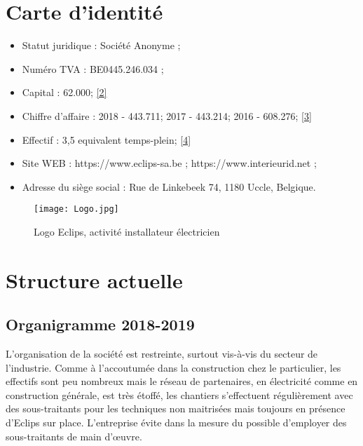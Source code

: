 \documentclass[a4paper, 12pt]{article}
\begin{document}
\section{Carte d'identité}
 
    \begin{itemize}
        \item Statut juridique : Société Anonyme ;
        \item Numéro TVA : BE0445.246.034 ;
        \item Capital : 62.000\EUR; \href{https://kbopub.economie.fgov.be/kbopub/zoeknummerform.html?nummer=0445.246.034&actionLu=Recherche#null}{[2]}
        \item Chiffre d'affaire : 2018 - 443.711\EUR; 2017 - 443.214\EUR; 2016 - 608.276\EUR; \href{https://www.companyweb.be/societe/eclips/sa/445246034}{[3]}
        \item Effectif : 3,5 equivalent temps-plein; \href{https://kbopub.economie.fgov.be/kbopub/zoeknummerform.html?nummer=0445.246.034&actionLu=Recherche#null}{[4]}
        \item Site WEB : https://www.eclips-sa.be ; https://www.interieurid.net ;
        \item Adresse du siège social : Rue de Linkebeek 74, 1180 Uccle, Belgique.
        
    \end{itemize}        
        
\begin{figure}[h]
	\texttt{[image: Logo.jpg]}
		\centering
		\caption{Logo Eclips, activité installateur électricien}
\end{figure}

\section{Structure actuelle }

\subsection{Organigramme 2018-2019}
 
L'organisation de la société est restreinte, surtout vis-à-vis du secteur de l'industrie. Comme à l'accoutumée dans la construction chez le particulier, les effectifs sont peu nombreux mais le réseau de partenaires, en électricité comme en construction générale, est très étoffé, les chantiers s'effectuent régulièrement avec des sous-traitants pour les techniques non maitrisées mais toujours en présence d'Eclips sur place. L'entreprise évite dans la mesure du possible d'employer des sous-traitants de main d'\oe{}uvre.
 
\end{document}
